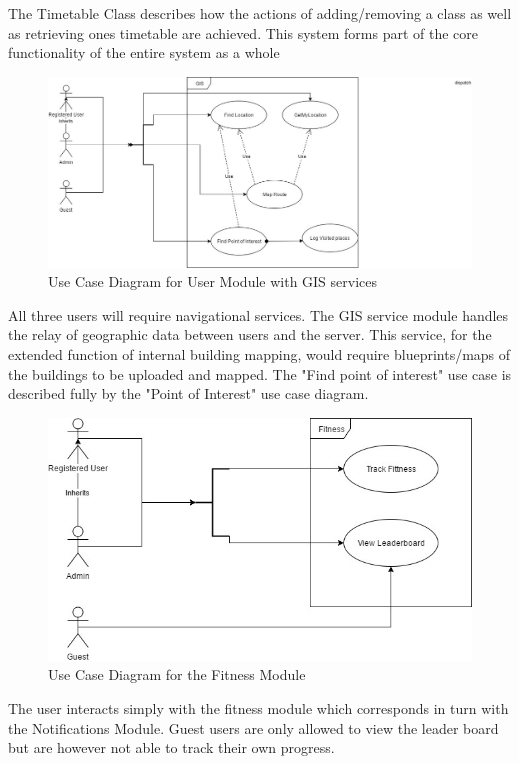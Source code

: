 \documentclass{article}
\begin{document}
		{The Timetable Class describes how the actions of adding/removing a class as well as retrieving ones timetable are achieved. This system forms part of the core functionality of the entire system as a whole}
		
		\begin{figure}[h]
			\includegraphics[width=\textwidth]{./Images/User_Use_Case_Diagrams_GIS.jpg}
			\caption{Use Case Diagram for User Module with GIS services}
		\end{figure}
	
		{All three users will require navigational services. The GIS service module handles the relay of geographic data between users and the server. This service, for the extended function of internal building mapping, would require blueprints/maps of the buildings to be uploaded and mapped. The "Find point of interest" use case is described fully by the "Point of Interest" use case diagram. }
		
		\begin{figure}
			\includegraphics[width=\textwidth]{./Images/User_Use_Case_Fitness.jpg}
			\caption{Use Case Diagram for the Fitness Module}
		\end{figure}
	
		{The user interacts simply with the fitness module which corresponds in turn with the Notifications Module. Guest users are only allowed to view the leader board but are however not able to track their own progress.}
		\\ \\
		\newpage
\end{document}
